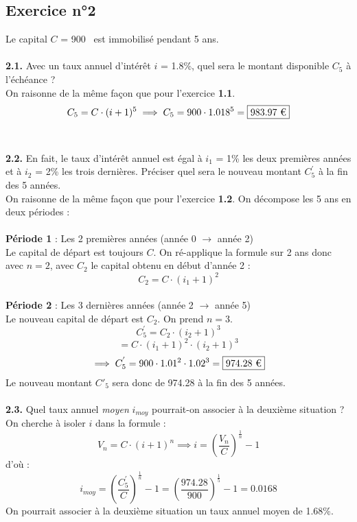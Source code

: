 \documentclass{article}
\begin{document}
\subsection{Exercice n°2}
\textcolor{exogris}{
Le capital $C$ = 900 \texteuro est immobilisé pendant 5 ans.
}
\\\\ \textcolor{exogris}{\textbf{2.1.}
Avec un taux annuel d’intérêt $i$ = 1.8\%, quel sera le montant disponible $C_5$ à l’échéance ?
}
\\%
On raisonne de la même façon que pour l'exercice \textbf{1.1}.
$$C_5 = C\cdot(i+1)^5 \implies C_5 = 900 \cdot 1.018^5 = \boxed{983.97\text{ \texteuro}}$$
\\%
\\%
\textcolor{exogris}{\textbf{2.2.}
En fait, le taux d’intérêt annuel est égal à $i_1$ = 1\% les deux premières années et à $i_2$ = 2\% les trois dernières. Préciser quel sera le nouveau montant $C^{'}_5$ à la fin des 5 années.
}
\\%
On raisonne de la même façon que pour l'exercice \textbf{1.2}.
On décompose les 5 ans en deux périodes :
\\\\\textbf{Période 1} : Les 2 premières années (année 0 $\rightarrow$ année 2)
\\Le capital de départ est toujours $C$. On ré-applique la formule sur 2 ans donc avec $n=2$, avec $C_2$ le capital obtenu en début d'année 2 :
$$C_2 = C \cdot (i_1+1)^2$$
\\\textbf{Période 2} : Les 3 dernières années (année 2 $\rightarrow$ année 5)
\\Le nouveau capital de départ est $C_2$. On prend $n = 3$.
$$C^{'}_5 = C_2\cdot(i_2+1)^3$$
$$= C\cdot(i_1+1)^2\cdot(i_2+1)^3$$
$$\implies C^{'}_5 = 900\cdot1.01^2\cdot1.02^3 = \boxed{974.28\text{ \texteuro}}$$
%
Le nouveau montant $C'_5$ sera donc de 974.28 \texteuro à la fin des 5 années.
\\%
\\%
\textcolor{exogris}{\textbf{2.3.}
Quel taux annuel \textit{moyen} $i_{moy}$ pourrait-on associer à la deuxième situation ?
}%
\\%
On cherche à isoler $i$ dans la formule : 
$$V_n = C\cdot(i+1)^n \implies i = \left(\dfrac{V_n}{C}\right)^{\frac{1}{n}}-1$$
d'où :
$$i_{moy} = \left(\dfrac{C^{'}_5}{C}\right)^{\frac{1}{n}}-1 = \left(\dfrac{974.28}{900}\right)^{\frac{1}{5}}-1 = \boxed{0.0168}$$
On pourrait associer à la deuxième situation un taux annuel moyen de 1.68\%.
\end{document}
